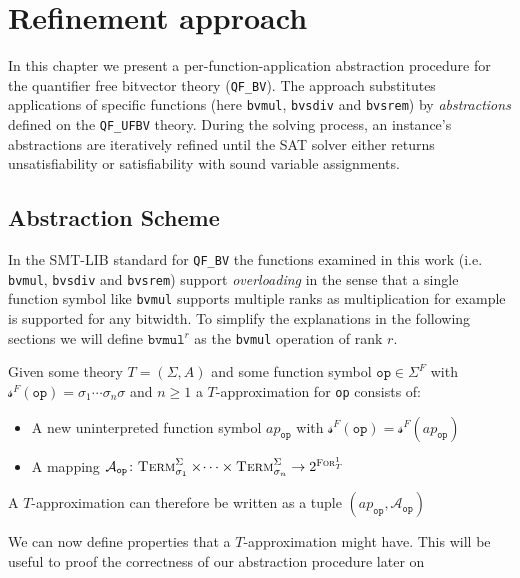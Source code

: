 \chapter{Refinement approach}
In this chapter we present a per-function-application abstraction procedure for the quantifier free bitvector theory (\texttt{QF\_BV}).
The approach substitutes applications of specific functions (here \texttt{bvmul}, \texttt{bvsdiv} and \texttt{bvsrem}) by \textit{abstractions} defined on the \texttt{QF\_UFBV} theory.
During the solving process, an instance's abstractions are iteratively refined until the SAT solver either returns unsatisfiability or satisfiability with sound variable assignments.

\section{Abstraction Scheme}
In the SMT-LIB standard \cite{BarFT-SMTLIB} for \texttt{QF\_BV} the functions examined in this work (i.e. \texttt{bvmul}, \texttt{bvsdiv} and \texttt{bvsrem}) support \textit{overloading} in the sense that a single function symbol like \texttt{bvmul} supports multiple ranks as multiplication for example is supported for any bitwidth.
To simplify the explanations in the following sections we will define $\texttt{bvmul}^r$ as the \texttt{bvmul} operation of rank $r$.

\begin{definition}[Approximation]
Given some theory $T=\left(\Sigma,A\right)$ and some function symbol $\texttt{op}\in\Sigma^F$ with $\mathcal{s}^F\left(\texttt{op}\right)=\sigma_1\dotsi\sigma_n\sigma$ and $n\geq1$ a $T$-approximation for \texttt{op} consists of:
\begin{itemize}
    \item A new uninterpreted function symbol $ap_{\texttt{op}}$ with $\mathcal{s}^F\left(\texttt{op}\right) = \mathcal{s}^F\left(ap_{\texttt{op}}\right)$
    \item A mapping $\mathcal{A}_{\texttt{op}}\colon \textsc{Term}^\Sigma_{\sigma_1}\times\dotsi\times\textsc{Term}^\Sigma_{\sigma_n} \to 2^{\textsc{For}^1_T}$
\end{itemize}
A $T$-approximation can therefore be written as a tuple $\left(ap_{\texttt{op}}, \mathcal{A}_{\texttt{op}}\right)$
\end{definition}
We can now define properties that a $T$-approximation might have. This will be useful to proof the correctness of our abstraction procedure later on

